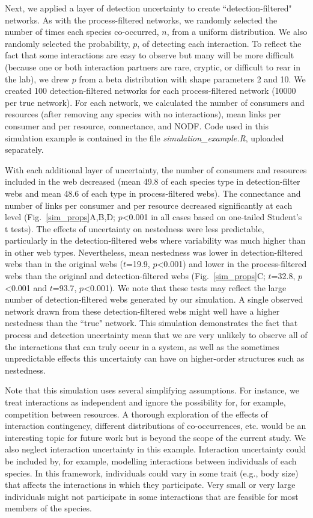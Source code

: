 \documentclass[12pt]{article}
\begin{document}
  Next, we applied a layer of detection uncertainty to create ``detection-filtered" networks. As with the process-filtered networks, we randomly selected the number of times each species co-occurred, $n$, from a uniform distribution. We also randomly selected the probability, $p$, of detecting each interaction. To reflect the fact that some interactions are easy to observe but many will be more difficult (because one or both interaction partners are rare, cryptic, or difficult to rear in the lab), we drew $p$ from a beta distribution with shape parameters 2 and 10. We created 100 detection-filtered networks for each process-filtered network (10000 per true network). For each network, we calculated the number of consumers and resources (after removing any species with no interactions), mean links per consumer and per resource, connectance, and NODF. Code used in this simulation example is contained in the file \emph{simulation\_example.R}, uploaded separately.


  With each additional layer of uncertainty, the number of consumers and resources included in the web decreased (mean 49.8 of each species type in detection-filter webs and mean 48.6 of each type in process-filtered webs). The connectance and number of links per consumer and per resource decreased significantly at each level (Fig.~\ref{sim_props}A,B,D; $p$\textless0.001 in all cases based on one-tailed Student's t tests). The effects of uncertainty on nestedness were less predictable, particularly in the detection-filtered webs where variability was much higher than in other web types. Nevertheless, mean nestedness was lower in detection-filtered webs than in the original webs ($t$=19.9, $p$\textless0.001) and lower in the process-filtered webs than the original and detection-filtered webs (Fig.~\ref{sim_props}C; $t$=32.8, $p$\textless0.001 and $t$=93.7, $p$\textless0.001). We note that these tests may reflect the large number of detection-filtered webs generated by our simulation. A single observed network drawn from these detection-filtered webs might well have a higher nestedness than the ``true" network. This simulation demonstrates the fact that process and detection uncertainty mean that we are very unlikely to observe all of the interactions that can truly occur in a system, as well as the sometimes unpredictable effects this uncertainty can have on higher-order structures such as nestedness.


  Note that this simulation uses several simplifying assumptions. For instance, we treat interactions as independent and ignore the possibility for, for example, competition between resources. A thorough exploration of the effects of interaction contingency, different distributions of co-occurrences, etc. would be an interesting topic for future work but is beyond the scope of the current study. We also neglect interaction uncertainty in this example. Interaction uncertainty could be included by, for example, modelling interactions between individuals of each species. In this framework, individuals could vary in some trait (e.g., body size) that affects the interactions in which they participate. Very small or very large individuals might not participate in some interactions that are feasible for most members of the species. 
\end{document}
